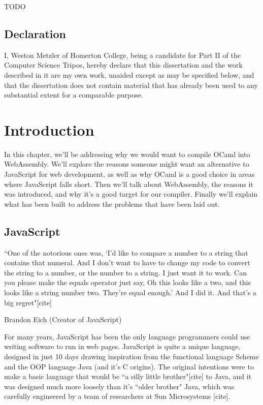 \documentclass[12pt,a4paper,twoside,openright]{report}
\begin{document}
TODO

\newpage
\section*{Declaration}

I, Weston Metzler of Homerton College, being a candidate for Part II of the Computer
Science Tripos, hereby declare that this dissertation and the work described in
it are my own work, unaided except as may be specified below, and that the
dissertation does not contain material that has already been used to any substantial
extent for a comparable purpose.

\bigskip
{}

\medskip
{}

\tableofcontents

\listoffigures


\pagestyle{headings}

\chapter{Introduction}
In this chapter, we'll be addressing why we would want to compile OCaml into WebAssembly.
We'll explore the reasons someone might want an alternative to JavaScript for web development, as well as why OCaml is a good choice in areas where JavaScript falls short.
Then we'll talk about WebAssembly, the reasons it was introduced, and why it's a good target for our compiler.
Finally we'll explain what has been built to address the problems that have been laid out.

\section{JavaScript}

\epigraph{“One of the notorious ones was, ‘I’d like to compare a number to a string that contains that numeral. And I don’t want to have to change my code to convert the string to a number, or the number to a string. I just want it to work. Can you please make the equals operator just say, Oh this looks like a two, and this looks like a string number two. They’re equal enough.’ And I did it. And that’s a big regret"[cite]}{Brandon Eich (Creator of JavaScript)}

For many years, JavaScript has been the only language programmers could use writing software to run in web pages.
JavaScript is quite a unique language, designed in just 10 days drawing inspiration from the functional language Scheme and the OOP language Java (and it's C origins).
The original intentions were to make a basic language that would be ``a silly little brother"[cite] to Java, and it was designed much more loosely than it's ``older brother" Java, which was carefully engineered by a team of researchers at Sun Microsystems [cite].
\end{document}
